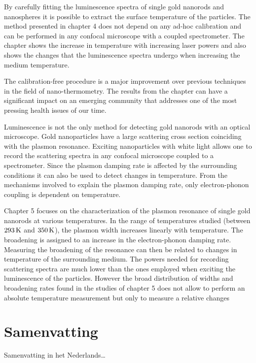 By carefully fitting the luminescence spectra of single gold nanorods and
nanospheres it is possible to extract the surface temperature of the particles.
The method presented in chapter 4 does not depend on any ad-hoc calibration and
can be performed in any confocal microscope with a coupled spectrometer. The
chapter shows the increase in temperature with increasing laser powers and also
shows the changes that the luminescence spectra undergo when increasing the
medium temperature.

The calibration-free procedure is a major improvement over previous techniques
in the field of nano-thermometry. The results from the chapter can have a
significant impact on an emerging community that addresses one of the most
pressing health issues of our time.

Luminescence is not the only method for detecting gold nanorods with an optical
microscope. Gold nanoparticles have a large scattering cross section coinciding
with the plasmon resonance. Exciting nanoparticles with white light allows one
to record the scattering spectra in any confocal microscope coupled to a
spectrometer. Since the plasmon damping rate is affected by the surrounding
conditions it can also be used to detect changes in temperature. From the
mechanisms involved to explain the plasmon damping rate, only electron-phonon
coupling is dependent on temperature. 

Chapter 5 focuses on the characterization of the plasmon resonance of single
gold nanorods at various temperatures. In the range of temperatures studied
(between $293\,\textrm{K}$ and $350\,\textrm{K}$), the plasmon width increases linearly with
temperature. The broadening is assigned to an increase in the electron-phonon
damping rate. Measuring the broadening of the resonance can then be related to
changes in temperature of the surrounding medium. The powers needed for
recording scattering spectra are much lower than the ones employed when exciting
the luminescence of the particles. However the broad distribution of widths and
broadening rates found in the studies of chapter 5 does not allow
to perform an absolute temperature measurement but only to measure a relative
changes


\chapter*{Samenvatting}

{

Samenvatting in het Nederlands\ldots

}

